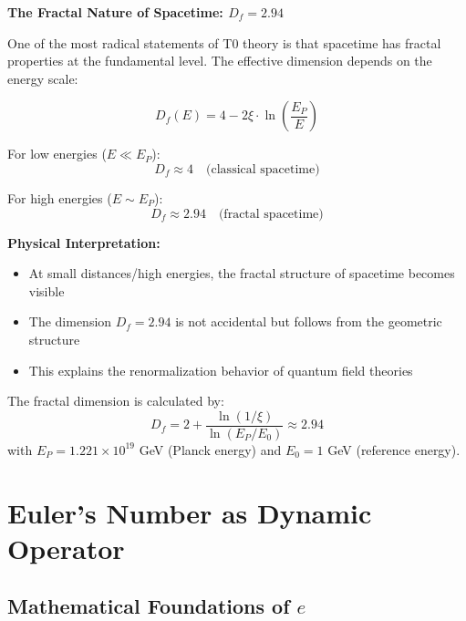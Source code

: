 \documentclass[12pt,a4paper]{article}
\newcommand{\xipar}{\xi}
\begin{document}
	\begin{treatise}
		\textbf{The Fractal Nature of Spacetime: $D_f = 2.94$}
		
		One of the most radical statements of T0 theory is that spacetime has fractal properties at the fundamental level. The effective dimension depends on the energy scale:
		
		\begin{equation}
			D_f(E) = 4 - 2\xipar \cdot \ln\left(\frac{E_P}{E}\right)
		\end{equation}
		
		For low energies ($E \ll E_P$):
		\begin{equation}
			D_f \approx 4 \quad \text{(classical spacetime)}
		\end{equation}
		
		For high energies ($E \sim E_P$):
		\begin{equation}
			D_f \approx 2.94 \quad \text{(fractal spacetime)}
		\end{equation}
		
		\textbf{Physical Interpretation:}
		\begin{itemize}
			\item At small distances/high energies, the fractal structure of spacetime becomes visible
			\item The dimension $D_f = 2.94$ is not accidental but follows from the geometric structure
			\item This explains the renormalization behavior of quantum field theories
		\end{itemize}
		
		The fractal dimension is calculated by:
		\begin{equation}
			D_f = 2 + \frac{\ln(1/\xipar)}{\ln(E_P/E_0)} \approx 2.94
		\end{equation}
		with $E_P = 1.221 \times 10^{19}$ GeV (Planck energy) and $E_0 = 1$ GeV (reference energy).
	\end{treatise}
	
	\section{Euler's Number as Dynamic Operator}
	
	\subsection{Mathematical Foundations of $e$}
	
\end{document}
